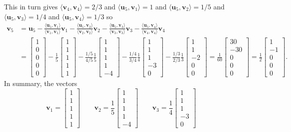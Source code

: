 \documentclass{amsart}
\newcommand{\bsm}       {\left[\begin{smallmatrix}}
\newcommand{\esm}       {\end{smallmatrix}\right]}
\newcommand{\ip}[1]     {\langle #1\rangle}
\newcommand{\vu}        {\mathbf{u}}
\newcommand{\vv}        {\mathbf{v}}
\renewcommand{\:}       {\colon}
\theoremstyle{definition}
\renewenvironment{solution}{\SolutionAtEnd}{\endSolutionAtEnd}
\begin{document}
\begin{solution}
 This in turn gives $\ip{\vv_4,\vv_4}=2/3$ and $\ip{\vu_5,\vv_1}=1$
 and $\ip{\vu_5,\vv_2}=1/5$ and $\ip{\vu_5,\vv_3}=1/4$ and
 $\ip{\vu_5,\vv_4}=1/3$ so 
 \begin{align*}
   \vv_5 &= \vu_5 - \frac{\ip{\vu_5,\vv_1}}{\ip{\vv_1,\vv_1}}\vv_1
              - \frac{\ip{\vu_5,\vv_2}}{\ip{\vv_2,\vv_2}}\vv_2
              - \frac{\ip{\vu_5,\vv_3}}{\ip{\vv_3,\vv_3}}\vv_3
              - \frac{\ip{\vu_5,\vv_4}}{\ip{\vv_4,\vv_4}}\vv_4 \\
   &= \bsm 1\\ 0\\ 0\\ 0\\ 0\esm 
      - \frac{1}{5} \bsm 1\\1\\1\\1\\1 \esm
      - \frac{1/5}{4/5} \frac{1}{5} \bsm 1\\1\\1\\1\\-4 \esm
      - \frac{1/4}{3/4} \frac{1}{4} \bsm 1\\1\\1\\-3\\0 \esm
      - \frac{1/3}{2/3} \frac{1}{3} \bsm 1\\1\\-2\\0\\0 \esm
    = \frac{1}{60} \bsm 30\\ -30\\ 0\\ 0\\ 0\esm 
    = \frac{1}{2} \bsm 1\\ -1\\ 0\\ 0\\ 0\esm .
 \end{align*}
 In summary, the vectors 
 \[ \vv_1 = \bsm 1\\1\\1\\1\\1\esm \hspace{2em}
    \vv_2 = \frac{1}{5}\bsm 1\\1\\1\\1\\-4\esm \hspace{2em}
    \vv_3 = \frac{1}{4}\bsm 1\\1\\1\\-3\\0\esm \hspace{2em}
\]
\end{solution}
\end{document}
